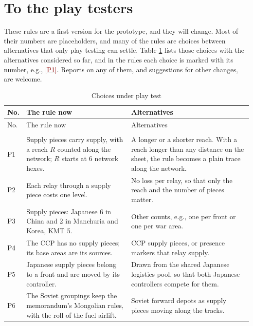 \documentclass[11pt]{article}
\newcommand{\ptest}[1]{\hyperlink{ptest}{\textcolor{darkred}{[P#1]}}}
\begin{document}
\section*{To the play testers}
\hypertarget{ptest}{}\label{sec:playtest}
These rules are a first version for the prototype, and they will change. Most of their numbers are placeholders, and many of the rules are choices between alternatives that only play testing can settle. Table \ref{tab:choices} lists those choices with the alternatives considered so far, and in the rules each choice is marked with its number, e.g., \ptest{1}. Reports on any of them, and suggestions for other changes, are welcome.

{\footnotesize
\begin{longtable}{@{}>{\raggedright\arraybackslash}p{}>{\raggedright\arraybackslash}p{}>{\raggedright\arraybackslash}p{}@{}}
\caption{Choices under play test}\label{tab:choices}\\
\toprule
No. & The rule now & Alternatives \\
\midrule
\endfirsthead
\toprule
No. & The rule now & Alternatives \\
\midrule
\endhead
\bottomrule
\endfoot
\multicolumn{3}{@{}l}{\textbf{Supply} (section \ref{sub:supply})} \\
P1 & Supply pieces carry supply, with a reach $R$ counted along the network; $R$ starts at 6 network hexes. & A longer or a shorter reach. With a reach longer than any distance on the sheet, the rule becomes a plain trace along the network. \\
P2 & Each relay through a supply piece costs one level. & No loss per relay, so that only the reach and the number of pieces matter. \\
P3 & Supply pieces: Japanese 6 in China and 2 in Manchuria and Korea, KMT 5. & Other counts, e.g., one per front or one per war area. \\
P4 & The CCP has no supply pieces; its base areas are its sources. & CCP supply pieces, or presence markers that relay supply. \\
P5 & Japanese supply pieces belong to a front and are moved by its controller. & Drawn from the shared Japanese logistics pool, so that both Japanese controllers compete for them. \\
P6 & The Soviet groupings keep the memorandum's Mongolian rules, with the roll of the fuel airlift. & Soviet forward depots as supply pieces moving along the tracks. \\

\end{longtable}}
\end{document}

